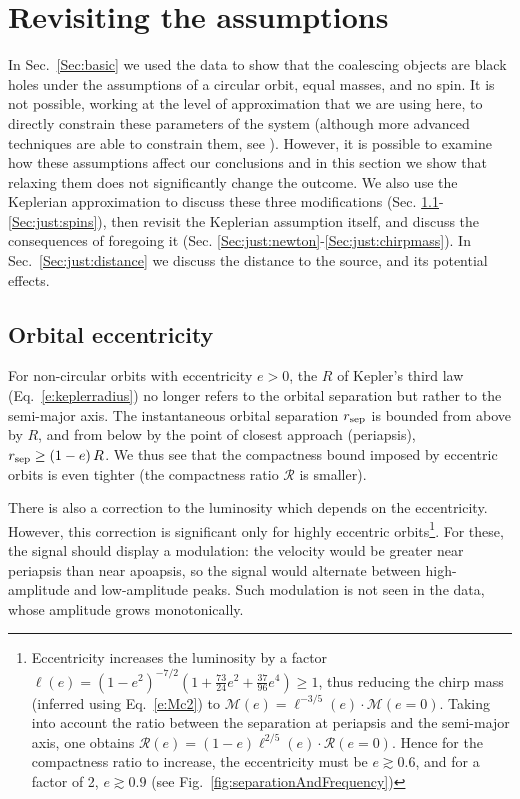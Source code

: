 \documentclass{andp2012}%
\def\({\left(}
\def\){\right)}
\newcommand{\inlinecite}[1]{\cite{#1}}
\newcommand{\refigure}[1]{Fig.~\ref{#1}}
\newcommand{\refsec}[1]{Sec.\ \ref{#1}}
\newcommand{\refeqn}[1]{Eq.\ \ref{#1}}
\newcommand{\caveatformat}[1]{\subsection{#1}}
\def\Mc{\mathcal{M}}
\begin{document}
\section{Revisiting the assumptions}
\label{Sec:justifications}

In \refsec{Sec:basic} we used the data to show that the
coalescing objects are black holes under the assumptions of a circular orbit,
equal masses, and no spin.
It is not possible, working at the level of approximation that we are using here,
to directly constrain these parameters of the system
(although more advanced techniques
are able to constrain them, see \inlinecite{PEPaper}).
However, it is possible to examine how these assumptions affect our conclusions
and in this section we show that
relaxing them does not significantly change the outcome. 
We also use the Keplerian approximation
to discuss these three modifications (Sec. \ref{Sec:just:ecc}-\ref{Sec:just:spins}),
then revisit the Keplerian assumption itself,
and discuss the consequences of foregoing it
(Sec. \ref{Sec:just:newton}-\ref{Sec:just:chirpmass}).
In \refsec{Sec:just:distance} we discuss
the distance to the source,
and its potential effects.

\caveatformat{Orbital eccentricity}
\label{Sec:just:ecc}
For non-circular orbits
with eccentricity $e > 0$,
the $R$ of Kepler's third law
(\refeqn{e:keplerradius}) no longer refers to the
orbital separation but rather to the semi-major axis.
The instantaneous orbital separation $r_{\rm sep}$
is bounded from above by $R$,
and from below by the point of closest approach (periapsis),
$r_{\rm sep} \ge \(1-e\) R$.
We thus see that the compactness bound
imposed by eccentric orbits is even tighter
(the compactness ratio $\mathcal{R}$ is smaller).

There is also a correction to the luminosity
which depends on the eccentricity.
However, this correction is significant
only for highly eccentric orbits\footnote{
Eccentricity increases
the luminosity\cite{Peters:1963ux, Peters:1964qza}
by a factor
$\ell(e)=\(1-e^2\)^{-7/2} \(1 + \frac{73}{24}e^2 + \frac{37}{96}e^4 \) \geq 1$,
thus reducing the chirp mass (inferred using \refeqn{e:Mc2})
to $\Mc(e) = \ell^{-3/5}(e) \cdot \Mc(e\!=\!0)$.
Taking into account the ratio between
the separation at periapsis and the semi-major axis,
one obtains
$\mathcal{R}(e)=\(1-e\)\ell^{2/5}(e)\cdot\mathcal{R}(e\!=\!0)$.
Hence for the compactness ratio to increase,
the eccentricity must be $e \gtrsim 0.6$,
and for a factor of 2, $e \gtrsim 0.9$
(see \refigure{fig:separationAndFrequency})}.
For these,
the signal should display a modulation\cite{Tanay:2016zog}:
the velocity would be greater near periapsis
than near apoapsis,
so the signal would alternate between
high-amplitude and low-amplitude peaks.
Such modulation is not seen in the data,
whose amplitude grows monotonically.
\end{document}
